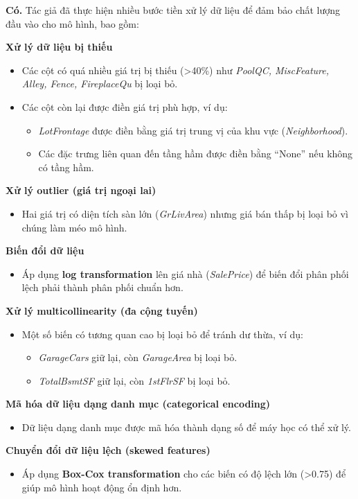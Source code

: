 \textbf{Có.} Tác giả đã thực hiện nhiều bước tiền xử lý dữ liệu để đảm bảo chất lượng đầu vào cho mô hình, bao gồm:

\textbf{Xử lý dữ liệu bị thiếu}
\begin{itemize}
    \item Các cột có quá nhiều giá trị bị thiếu (>40\%) như \textit{PoolQC, MiscFeature, Alley, Fence, FireplaceQu} bị loại bỏ.
    \item Các cột còn lại được điền giá trị phù hợp, ví dụ:
    \begin{itemize}
        \item \textit{LotFrontage} được điền bằng giá trị trung vị của khu vực (\textit{Neighborhood}).
        \item Các đặc trưng liên quan đến tầng hầm được điền bằng ``None'' nếu không có tầng hầm.
    \end{itemize}
\end{itemize}

\textbf{Xử lý outlier (giá trị ngoại lai)}
\begin{itemize}
    \item Hai giá trị có diện tích sàn lớn (\textit{GrLivArea}) nhưng giá bán thấp bị loại bỏ vì chúng làm méo mô hình.
\end{itemize}

\textbf{Biến đổi dữ liệu}
\begin{itemize}
    \item Áp dụng \textbf{log transformation} lên giá nhà (\textit{SalePrice}) để biến đổi phân phối lệch phải thành phân phối chuẩn hơn.
\end{itemize}

\textbf{Xử lý multicollinearity (đa cộng tuyến)}
\begin{itemize}
    \item Một số biến có tương quan cao bị loại bỏ để tránh dư thừa, ví dụ:
    \begin{itemize}
        \item \textit{GarageCars} giữ lại, còn \textit{GarageArea} bị loại bỏ.
        \item \textit{TotalBsmtSF} giữ lại, còn \textit{1stFlrSF} bị loại bỏ.
    \end{itemize}
\end{itemize}

\textbf{Mã hóa dữ liệu dạng danh mục (categorical encoding)}
\begin{itemize}
    \item Dữ liệu dạng danh mục được mã hóa thành dạng số để máy học có thể xử lý.
\end{itemize}

\textbf{Chuyển đổi dữ liệu lệch (skewed features)}
\begin{itemize}
    \item Áp dụng \textbf{Box-Cox transformation} cho các biến có độ lệch lớn (>0.75) để giúp mô hình hoạt động ổn định hơn.
\end{itemize}
